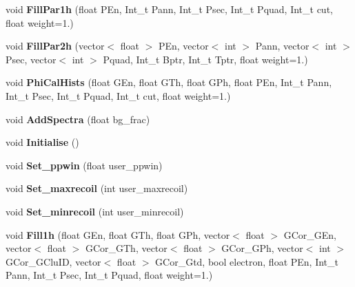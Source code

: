 \begin{DoxyCompactItemize}
\mbox{\label{classhists_a618651882b77d410480e624dfd4b8ee4}} 
void {\bfseries Fill\+Par1h} (float P\+En, Int\+\_\+t Pann, Int\+\_\+t Psec, Int\+\_\+t Pquad, Int\+\_\+t cut, float weight=1.)
\item 
\mbox{\label{classhists_abdb2e69023e9fdd9080bcef611c26125}} 
void {\bfseries Fill\+Par2h} (vector$<$ float $>$ P\+En, vector$<$ int $>$ Pann, vector$<$ int $>$ Psec, vector$<$ int $>$ Pquad, Int\+\_\+t Bptr, Int\+\_\+t Tptr, float weight=1.)
\item 
\mbox{\label{classhists_ab48ef7120a82723ec1db8fde8143d532}} 
void {\bfseries Phi\+Cal\+Hists} (float G\+En, float G\+Th, float G\+Ph, float P\+En, Int\+\_\+t Pann, Int\+\_\+t Psec, Int\+\_\+t Pquad, Int\+\_\+t cut, float weight=1.)
\item 
\mbox{\label{classhists_a52b2233e6775d4a9bf714368101116cb}} 
void {\bfseries Add\+Spectra} (float bg\+\_\+frac)
\item 
\mbox{\label{classhists_a70566f0da5744717becf6a02bc98cb69}} 
void {\bfseries Initialise} ()
\item 
\mbox{\label{classhists_a98cf7d91940c6d77105d07b0783399ee}} 
void {\bfseries Set\+\_\+ppwin} (float user\+\_\+ppwin)
\item 
\mbox{\label{classhists_ae986e831e139c9e7e5a4e327e864484d}} 
void {\bfseries Set\+\_\+maxrecoil} (int user\+\_\+maxrecoil)
\item 
\mbox{\label{classhists_acfb845682216224712565e7b8a1c3ce2}} 
void {\bfseries Set\+\_\+minrecoil} (int user\+\_\+minrecoil)
\item 
\mbox{\label{classhists_a4cc3927b58899125a7691a50101fb902}} 
void {\bfseries Fill1h} (float G\+En, float G\+Th, float G\+Ph, vector$<$ float $>$ G\+Cor\+\_\+\+G\+En, vector$<$ float $>$ G\+Cor\+\_\+\+G\+Th, vector$<$ float $>$ G\+Cor\+\_\+\+G\+Ph, vector$<$ int $>$ G\+Cor\+\_\+\+G\+Clu\+ID, vector$<$ float $>$ G\+Cor\+\_\+\+Gtd, bool electron, float P\+En, Int\+\_\+t Pann, Int\+\_\+t Psec, Int\+\_\+t Pquad, float weight=1.)
\item 

\end{DoxyCompactItemize}
